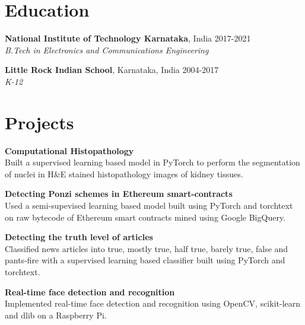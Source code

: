 \documentclass[margin]{res}
\begin{document}
  \address{National Institute of Technology\\
           Karnataka, India\\
           russel.171ec143@nitk.edu.in}
  \address{(91+) 9611212081\\
           \href{https://linkedin.com/in/rshwndsz}{linkedin.com/in/rshwndsz}\\
           \href{https://github.com/rshwndsz}{github.com/rshwndsz}}


  \begin{resume}
    \section{Education}
      \textbf{National Institute of Technology Karnataka}, India\hfill
      2017-2021 \\
      {\sl B.Tech in Electronics and Communications Engineering}\hfill

      \textbf{Little Rock Indian School}, Karnataka, India\hfill
      2004-2017 \\
      {\sl K-12}\hfill


    \section{Projects}
      \par
      \textbf{Computational Histopathology}\\
      Built a supervised learning based model in PyTorch to perform the segmentation of nuclei in H\&E stained histopathology images of kidney tissues.

      \par
      \textbf{Detecting Ponzi schemes in Ethereum smart-contracts}\\
      Used a semi-supevised learning based model built using PyTorch and torchtext on raw bytecode of Ethereum smart contracts mined using Google BigQuery.

      \par
      \textbf{Detecting the truth level of articles}\\
      Classified news articles into true, mostly true, half true, barely true, false and pants-fire with a supervised learning based classifier built using PyTorch and torchtext.

      \par
      \textbf{Real-time face detection and recognition}\\
      Implemented real-time face detection and recognition using OpenCV, scikit-learn and dlib on a Raspberry Pi.



\end{resume}
\end{document}
